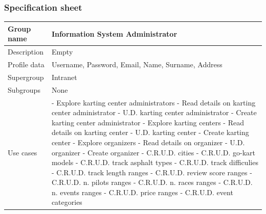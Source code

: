 \documentclass{beamer}
\begin{document}
\begin{frame}
    \frametitle{Specification sheet}
    \begin{table}
        \tiny
        \begin{tabular}{|p{2cm}|p{6cm}|}
        \hline
        Group name & \textbf{Information System Administrator} \\
        \hline
        Description & Empty \\
        \hline
        Profile data & Username, Password, Email, Name, Surname, Address \\
        Supergroup & Intranet \\
        \hline
        Subgroups & None \\
        \hline
        Use cases & 
        - Explore karting center administrators \newline
        - Read details on karting center administrator \newline
        - U.D. karting center administrator \newline
        - Create karting center administrator \newline
        - Explore karting centers \newline
        - Read details on karting center \newline
        - U.D. karting center \newline
        - Create karting center \newline
        - Explore organizers \newline
        - Read details on organizer \newline
        - U.D. organizer \newline
        - Create organizer \newline
        - C.R.U.D. cities \newline
        - C.R.U.D. go-kart models \newline
        - C.R.U.D. track asphalt types \newline
        - C.R.U.D. track difficulies \newline
        - C.R.U.D. track length ranges \newline
        - C.R.U.D. review score ranges \newline
        - C.R.U.D. n. pilots ranges \newline
        - C.R.U.D. n. races ranges \newline
        - C.R.U.D. n. events ranges \newline
        - C.R.U.D. price ranges \newline
        - C.R.U.D. event categories \\
        \hline
        \end{tabular}
    \end{table}
\end{frame}
\end{document}
